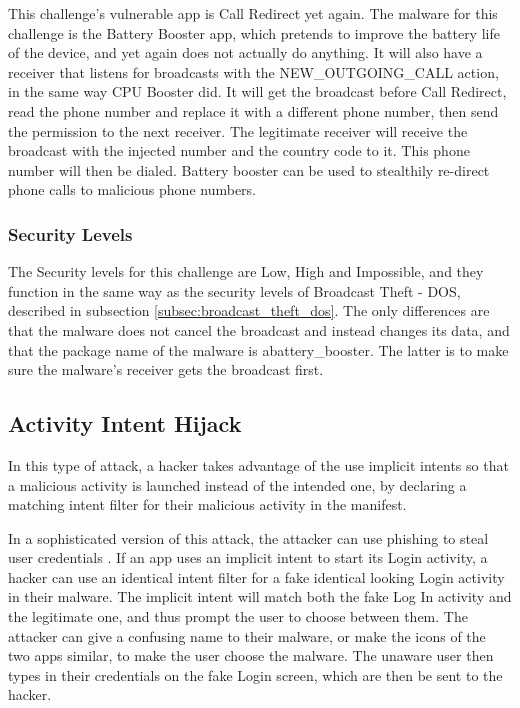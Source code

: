     This challenge's vulnerable app is Call Redirect yet again. The malware for this challenge is the Battery Booster app, which pretends to improve the battery life of the device, and yet again does not actually do anything. It will also have a receiver that listens for broadcasts with the NEW\_OUTGOING\_CALL action, in the same way CPU Booster did. It will get the broadcast before Call Redirect, read the phone number and replace it with a different phone number, then send the permission to the next receiver. The legitimate receiver will receive the broadcast with the injected number and the country code to it. This phone number will then be dialed. Battery booster can be used to stealthily re-direct phone calls to malicious phone numbers.
    
    \subsubsection{Security Levels}
        \label{subsubsec:broadcast_theft_mitm_security_levels}
        
    The Security levels for this challenge are Low, High and Impossible, and they function in the same way as the security levels of Broadcast Theft - DOS, described in subsection \ref{subsec:broadcast_theft_dos}. The only differences are that the malware does not cancel the broadcast and instead changes its data, and that the package name of the malware is abattery\_booster. The latter is to make sure the malware's receiver gets the broadcast first.
    
    \subsection{Activity Intent Hijack}
        \label{subsec:activity_hijacking}
        
    In this type of attack, a hacker takes advantage of the use implicit intents so that a malicious activity is launched instead of the intended one, by declaring a matching intent filter for their malicious activity in the manifest.
    
    In a sophisticated version of this attack, the attacker can use phishing to steal user credentials \cite{2010_icc_paper}. If an app uses an implicit intent to start its Login activity, a hacker can use an identical intent filter for a fake identical looking Login activity in their malware. The implicit intent will match both the fake Log In activity and the legitimate one, and thus prompt the user to choose between them. The attacker can give a confusing name to their malware, or make the icons of the two apps similar, to make the user choose the malware. The unaware user then types in their credentials on the fake Login screen, which are then be sent to the hacker.
    
